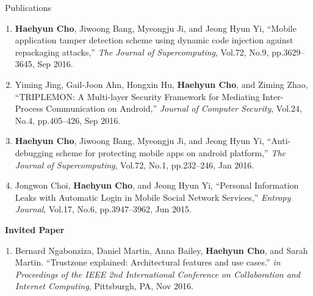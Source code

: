 \documentclass{resume} %
\begin{document}
\begin{rSection}{\faGenderless~Publications}
\begin{enumerate}[leftmargin=0pt]
		\item \textbf{Haehyun Cho}, Jiwoong Bang, Myeongju Ji, and Jeong Hyun Yi, 
		``Mobile application tamper detection scheme using dynamic code injection against repackaging attacks,'' 
		\emph{The Journal of Supercomputing}, 
		Vol.72, No.9, pp.3629--3645, Sep 2016.

		\item Yiming Jing, Gail-Joon Ahn, Hongxin Hu, \textbf{Haehyun Cho}, and Ziming Zhao,
		``TRIPLEMON: A Multi-layer Security Framework for Mediating Inter-Process Communication on Android,'' 
		\emph{Journal of Computer Security}, 
		Vol.24, No.4, pp.405--426, Sep 2016.

		\item \textbf{Haehyun Cho}, Jiwoong Bang, Myeongju Ji, and Jeong Hyun Yi, 
		``Anti-debugging scheme for protecting mobile apps on android platform,'' 
		\emph{The Journal of Supercomputing}, 
		Vol.72, No.1, pp.232--246, Jan 2016.

		\item Jongwon Choi, \textbf{Haehyun Cho}, and Jeong Hyun Yi, 
		``Personal Information Leaks with Automatic Login in Mobile Social Network Services,'' 
		\emph{Entropy Journal}, 
		Vol.17, No.6, pp.3947--3962, Jun 2015.
	\end{enumerate}

    \vspace{3mm}

	\newpage
   
    \strut\textbullet~{\bf Invited Paper}
    \begin{enumerate}[leftmargin=0pt]
        \item Bernard Ngabonziza, Daniel Martin, Anna Bailey, \textbf{Haehyun Cho}, and Sarah Martin.
        ``Trustzone explained: Architectural features and use cases.''
        \emph{in Proceedings of the IEEE 2nd International Conference on Collaboration and Internet Computing}, 
        Pittsburgh, PA, Nov 2016.    
    \end{enumerate}

	\vspace{3mm}
\end{rSection}
\end{document}
